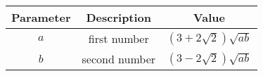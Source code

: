 \begin{tabular}{|c|c|c|}
        \hline
        \textbf{Parameter} & \textbf{Description}&\textbf{Value}\\
        \hline
        $a$ & first number & $ (3 + 2\sqrt{2})\sqrt{ab}$\\
         \hline
        $b$ & second number&$(3 - 2\sqrt{2})\sqrt{ab}$  \\
        \hline
    \end{tabular}
